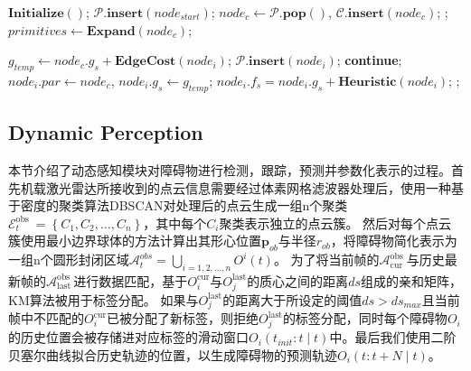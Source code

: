 \documentclass[preprint,5p,times,twocolumn]{elsarticle}
\begin{document}
\begin{algorithm}
\caption{ADSM-Guided Path Searching.}\label{algorithm.1}
\begin{algorithmic}[1]
\STATE $\textbf{Initialize}()$;\;
\STATE $\mathcal{P}\textbf{.insert}(node_{start})$;\;
\STATE $node_c \leftarrow \mathcal{P}\textbf{.pop}()$, $\mathcal{C}\textbf{.insert}\left(node_c\right)$;\;
    ;
\ENDIF
\STATE $ primitives \leftarrow \textbf{Expand}\left(node_c\right)$;\;

    \STATE $g_{temp} \leftarrow node_c.g_s+\textbf{EdgeCost}(node_i)$;\;
        \STATE $\mathcal{P}\textbf{.insert}(node_i)$;\;
        \STATE \textbf{continue};\;
    \ENDIF
    \STATE $node_i.par \leftarrow node_c$, $node_i.g_s \leftarrow g_{temp} $;\;
    \STATE $node_i.f_s = node_i.g_s+\textbf{Heuristic}(node_i)$;\;
\ENDIF
\ENDFOR
\ENDWHILE
{};\;
\end{algorithmic}
\end{algorithm}



\subsection{Dynamic Perception}
\label{Dynamic_Perception}
本节介绍了动态感知模块对障碍物进行检测，跟踪，预测并参数化表示的过程。首先机载激光雷达所接收到的点云信息需要经过体素网格滤波器处理后，使用一种基于密度的聚类算法DBSCAN对处理后的点云生成一组n个聚类$\mathcal{E}_t^{\text {obs }}=\left\{C_1, C_2, \ldots, C_n\right\}$，其中每个$C_i$聚类表示独立的点云簇。
然后对每个点云簇使用最小边界球体的方法计算出其形心位置$\boldsymbol{p}_{ob}$与半径$r_{ob}$，将障碍物简化表示为一组n个圆形封闭区域$\mathcal{A}_t^{o b s}=\bigcup_{i=1,2, \ldots, n} O^i(t)$。
为了将当前帧的$\mathcal{A}^{\text {obs }}_{\text {cur}}$与历史最新帧的$\mathcal{A}^{\text {obs }}_{\text {last}}$进行数据匹配，基于$O^{\text {cur}}_i$与$O^{\text {last}}_j$的质心之间的距离$ds$组成的亲和矩阵，KM算法被用于标签分配。
如果与$O^{\text {last}}_j$的距离大于所设定的阈值$ds>ds_{max}$且当前帧中不匹配的$O^{\text {cur}}_i$已被分配了新标签，则拒绝$O^{\text {last}}_j$的标签分配，同时每个障碍物$O_i$的历史位置会被存储进对应标签的滑动窗口$O_i(t_{init}: t \mid t)$中。最后我们使用二阶贝塞尔曲线拟合历史轨迹的位置，以生成障碍物的预测轨迹$O_i(t: t+N \mid t)$。
\end{document}
